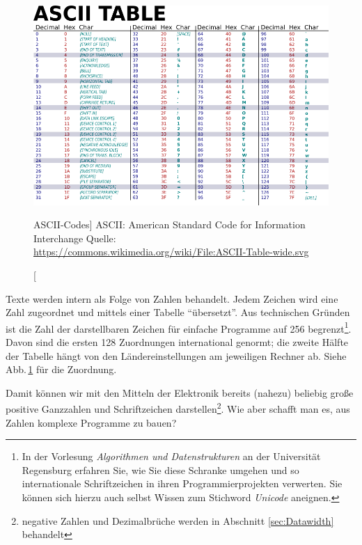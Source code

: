 \begin{figure}[b!]
\includegraphics[width=\linewidth]{./gfx/ASCII_table}\newline
\caption
	[ASCII-Codes]
	{ASCII: American Standard Code for Information Interchange\newline
         Quelle: \url{https://commons.wikimedia.org/wiki/File:ASCII-Table-wide.svg}
    }
\label{fig:ASCII}
\end{figure}
Texte werden intern als Folge von Zahlen behandelt. Jedem Zeichen wird eine Zahl zugeordnet und mittels einer Tabelle \enquote{übersetzt}. Aus technischen Gründen ist die Zahl der darstellbaren Zeichen für einfache Programme auf 256 begrenzt\footnote{In der Vorlesung \emph{Algorithmen und Datenstrukturen} an der Universität Regensburg erfahren Sie, wie Sie diese Schranke umgehen und so \eg internationale Schriftzeichen in ihren Programmierprojekten verwerten. Sie können sich hierzu auch selbst Wissen zum Stichword \emph{Unicode} aneignen.}. Davon sind die ersten 128 Zuordnungen international genormt; die zweite Hälfte der Tabelle hängt von den Ländereinstellungen am jeweiligen Rechner ab. Siehe Abb.\,\ref{fig:ASCII} für die Zuordnung.

Damit können wir mit den Mitteln der Elektronik bereits (nahezu) beliebig große positive Ganzzahlen und Schriftzeichen darstellen\footnote{negative Zahlen und Dezimalbrüche werden in Abschnitt \ref{sec:Datawidth} behandelt}. Wie aber schafft man es, aus Zahlen komplexe Programme zu bauen?

